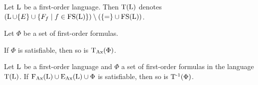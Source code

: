 \begin{defi}[continues=exa:cont]
	Let $\operatorname{L}$ be a first-order language. 
	Then $\operatorname{T}(\operatorname{L})$ denotes $(\LangSym\cup \{E\}\cup\{F_f\mid f \in \FS(\LangSym)\}) \setminus(\{=\nolinebreak \} \cup\nolinebreak \FS(\LangSym))$.
\end{defi}
\begin{prop}
	Let $\Phi$ be a set of first-order formulas.
	\begin{compactenum}
		\item If $\Phi$ is satisfiable, then so is $\operatorname{\operatorname{T}_{Ax}}(\Phi)$.
		\item Let $\operatorname{L}$ be a first-order language and $\Phi$ a set of first-order formulas in the language $\operatorname{T}(\operatorname{L})$.
			If $\operatorname{F_{Ax}}(\operatorname{L}) \cup \operatorname{E_{Ax}}(\operatorname{L}) \cup \Phi $ is satisfiable, then so is $\operatorname{T^{-1}}(\Phi)$.
	\end{compactenum}
\end{prop}
